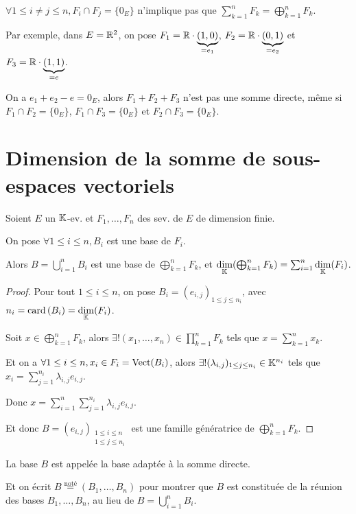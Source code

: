 \documentclass[12pt, a4paper]{report}
\begin{document}
\begin{remark}
    $\forall 1 \le i \ne j \le n, F_i \cap F_j = \{0_E\}$ n'implique pas que $\sum_{k=1}^n F_k = \bigoplus_{k=1}^n F_k$.

    Par exemple, dans $E = \mathbb{R}^2$, on pose $F_1 = \mathbb{R} \cdot \underbrace{(1,0)}_{=e_1}$, $F_2 = \mathbb{R} \cdot \underbrace{(0,1)}_{=e_2}$ et $F_3 = \mathbb{R} \cdot \underbrace{(1,1)}_{=e}$.

    On a $e_1 + e_2 - e = 0_E$, alors $F_1 + F_2 + F_3$ n'est pas une somme directe, même si $F_1 \cap F_2 = \{0_E\}$, $F_1 \cap F_3 = \{0_E\}$ et $F_2 \cap F_3 = \{0_E\}$.
\end{remark}

\section{Dimension de la somme de sous-espaces vectoriels}

\begin{theorem}
    Soient $E$ un $\mathbb{K}$-ev. et $F_1,\dots,F_n$ des sev. de $E$ de dimension finie.

    On pose $\forall 1 \le i \le n, B_i$ est une base de $F_i$.

    Alors $B = \bigcup_{i=1}^n B_i$ est une base de $\bigoplus_{k=1}^n F_k$, et $\underset{\mathbb{K}}\dim(\bigoplus_{k=1}^n F_k) = \sum_{i=1}^n \underset{\mathbb{K}}\dim(F_i)$.
\end{theorem}

\begin{proof}
    Pour tout $1 \le i \le n$, on pose $B_i = (e_{i,j})_{1 \le j \le n_i}$, avec $n_i = \mathrm{card}\left(B_i\right) = \underset{\mathbb{K}}\dim(F_i)$.

    Soit $x \in \bigoplus_{k=1}^n F_k$, alors $\exists ! (x_1,\dots,x_n) \in \prod_{k=1}^n F_k$ tels que $x = \sum_{k=1}^n x_k$.

    Et on a $\forall 1 \le i \le n, x_i \in F_i = \mathrm{Vect}(B_i)$, alors $\exists ! (\lambda_{i,j})_{1 \le j \le n_i} \in \mathbb{K}^{n_i}$ tels que $x_i = \sum_{j=1}^{n_i} \lambda_{i,j} e_{i,j}$.

    Donc $x = \sum_{i=1}^n\sum_{j=1}^{n_i} \lambda_{i,j} e_{i,j}$.

    Et donc $B = (e_{i,j})_{\substack{1 \le i \le n \\ 1 \le j \le n_i}}$ est une famille génératrice de $\bigoplus_{k=1}^n F_k$.
\end{proof}

\begin{remark}
    La base $B$ est appelée la base adaptée à la somme directe.

    Et on écrit $B \overset{\text{noté}}= (B_1,\dots,B_n)$ pour montrer que $B$ est constituée de la réunion des bases $B_1,\dots,B_n$, au lieu de $B = \bigcup_{i=1}^n B_i$.
\end{remark}
\end{document}
